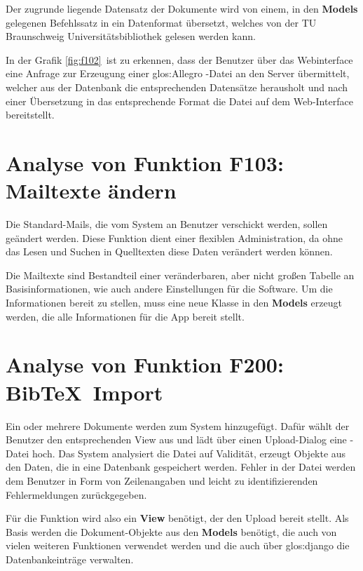 Der zugrunde liegende Datensatz der Dokumente wird von einem, in den
\textbf{Models} gelegenen Befehlssatz in ein Datenformat übersetzt, welches von
der TU Braunschweig Universitätsbibliothek gelesen werden kann. 

In der Grafik \ref{fig:f102}\ ist zu erkennen, dass der Benutzer über das
Webinterface eine Anfrage zur Erzeugung einer \gls{glos:Allegro} -Datei an den
Server übermittelt, welcher aus der Datenbank die entsprechenden Datensätze
herausholt und nach einer Übersetzung in das entsprechende Format die Datei auf
dem Web-Interface bereitstellt.

\section{Analyse von Funktion F103: Mailtexte ändern}
Die Standard-Mails, die vom System an Benutzer verschickt werden, sollen geändert
werden. Diese Funktion dient einer flexiblen Administration, da ohne das Lesen
und Suchen in Quelltexten diese Daten verändert werden können.

Die Mailtexte sind Bestandteil einer veränderbaren, aber nicht großen Tabelle an
Basisinformationen, wie auch andere Einstellungen für die Software. Um die
Informationen bereit zu stellen, muss eine neue Klasse in den \textbf{Models}
erzeugt werden, die alle Informationen für die App bereit stellt.


\section{Analyse von Funktion F200: Bib\TeX\ Import}
Ein oder mehrere Dokumente werden zum System hinzugefügt. Dafür wählt der
Benutzer den entsprechenden View aus und lädt über einen Upload-Dialog eine
\BibTeX -Datei hoch. Das System analysiert die Datei auf Validität, erzeugt
Objekte aus den Daten, die in eine Datenbank gespeichert werden. Fehler in der
Datei werden dem Benutzer in Form von Zeilenangaben und leicht zu
identifizierenden Fehlermeldungen zurückgegeben.


Für die Funktion wird also ein \textbf{View} benötigt, der den Upload bereit
stellt.  Als Basis werden die Dokument-Objekte aus den \textbf{Models} benötigt,
die auch von vielen weiteren Funktionen verwendet werden und die auch über
\gls{glos:django} die Datenbankeinträge verwalten.
